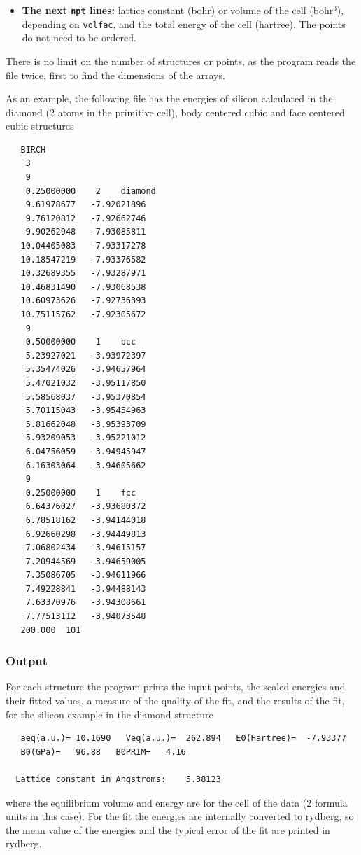 \documentclass[11pt]{article}
\begin{document}
\begin{itemize}
\item[] \textbf{The next \texttt{npt} lines:}
  lattice constant (bohr) or volume of the cell (bohr$^3$), depending on \texttt{volfac},
  and the total energy of the cell (hartree).
  The points do not need to be ordered.

\end{itemize}

There is no limit on the number of structures or points, as the program
reads the file twice, first to find the dimensions of the arrays.

As an example, the following file has the energies of silicon calculated in the
diamond (2 atoms in the primitive cell), body centered cubic and face centered cubic structures

\begin{verbatim}
   BIRCH
    3
    9
    0.25000000    2    diamond
    9.61978677   -7.92021896
    9.76120812   -7.92662746
    9.90262948   -7.93085811
   10.04405083   -7.93317278
   10.18547219   -7.93376582
   10.32689355   -7.93287971
   10.46831490   -7.93068538
   10.60973626   -7.92736393
   10.75115762   -7.92305672
    9
    0.50000000    1    bcc
    5.23927021   -3.93972397
    5.35474026   -3.94657964
    5.47021032   -3.95117850
    5.58568037   -3.95370854
    5.70115043   -3.95454963
    5.81662048   -3.95393709
    5.93209053   -3.95221012
    6.04756059   -3.94945947
    6.16303064   -3.94605662
    9
    0.25000000    1    fcc
    6.64376027   -3.93680372
    6.78518162   -3.94144018
    6.92660298   -3.94449813
    7.06802434   -3.94615157
    7.20944569   -3.94659005
    7.35086705   -3.94611966
    7.49228841   -3.94488143
    7.63370976   -3.94308661
    7.77513112   -3.94073548
   200.000  101
\end{verbatim}

\subsubsection{Output}

For each structure the program prints the input points, the scaled energies
and their fitted values, a measure of the quality of the fit, and the results
of the fit, for the silicon example in the diamond structure
\begin{verbatim}
   aeq(a.u.)= 10.1690   Veq(a.u.)=  262.894   E0(Hartree)=  -7.93377
   B0(GPa)=   96.88   B0PRIM=   4.16

  Lattice constant in Angstroms:    5.38123
\end{verbatim}
where the equilibrium volume and energy are for the cell of the data
(2 formula units in this case).
For the fit the energies are internally converted to rydberg,
so the mean value of the energies and the typical error of the fit are printed in rydberg.
\end{document}
